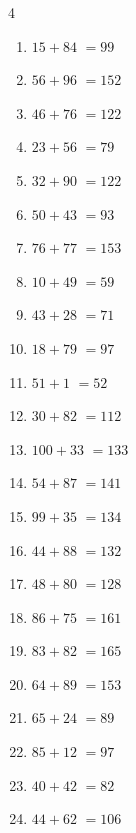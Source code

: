 \begin{multicols}{4}
\begin{enumerate}
  \item $15+84$
        $=99$

  \item $56+96$
        $=152$

  \item $46+76$
        $=122$

  \item $23+56$
        $=79$

  \item $32+90$
        $=122$

  \item $50+43$
        $=93$

  \item $76+77$
        $=153$

  \item $10+49$
        $=59$

  \item $43+28$
        $=71$

  \item $18+79$
        $=97$

  \item $51+1$
        $=52$

  \item $30+82$
        $=112$

  \item $100+33$
        $=133$

  \item $54+87$
        $=141$

  \item $99+35$
        $=134$

  \item $44+88$
        $=132$

  \item $48+80$
        $=128$

  \item $86+75$
        $=161$

  \item $83+82$
        $=165$

  \item $64+89$
        $=153$

  \item $65+24$
        $=89$

  \item $85+12$
        $=97$

  \item $40+42$
        $=82$

  \item $44+62$
        $=106$


\end{enumerate}
\end{multicols}
